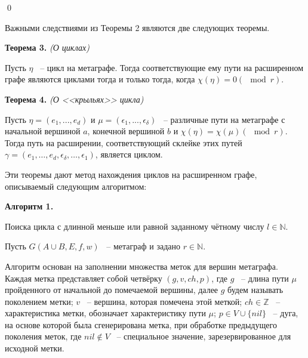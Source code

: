 \documentclass[14pt]{mmcs-article}
\begin{document}
\qed

Важными следствиями из Теоремы 2 являются две следующих теоремы.

\textbf{Теорема 3.} \textsl{(О циклах)}

Пусть $\eta$ ~-- цикл на метаграфе. Тогда соответствующие ему пути на расширенном графе являются циклами тогда и только тогда, когда $\chi(\eta) = 0 (\mod{r})$.

\textbf{Теорема 4.} \textsl{(О <<крыльях>> цикла)}

Пусть $\eta = (e_1, ..., e_d)$ и $\mu = (\epsilon_1, ..., \epsilon_{\delta})$ ~-- различные пути на метаграфе с начальной вершиной $a$, конечной вершиной $b$ и $\chi(\eta) = \chi(\mu) (\mod{r})$. Тогда путь на расширении, соответствующий склейке этих путей \\ $\gamma = (e_1, \dots, e_d, \epsilon_{\delta}, \dots, \epsilon_1)$, является циклом.

Эти теоремы дают метод нахождения циклов на расширенном графе, описываемый следующим алгоритмом:


\textbf{Алгоритм 1.}

Поиска цикла с длинной меньше или равной заданному чётному числу $l \in \mathbb{N}$.

Пусть $G(A \cup B, E, f, w)$ ~-- метаграф и задано $r \in \mathbb{N}$.

Алгоритм основан на заполнении множества меток для вершин метаграфа. Каждая метка представляет собой четвёрку $(g, v, ch, p)$, где $g$ ~-- длина пути $\mu$ пройденного от начальной до помечаемой вершины, далее $g$ будем называть поколением метки; $v$ ~-- вершина, которая помечена этой меткой; $ch \in \mathbb{Z}$ ~-- характеристика метки, обозначает характеристику пути $\mu$; $p \in V \cup \{ nil \}$ ~-- дуга, на основе которой была сгенерирована метка, при обработке предыдущего поколения меток, где $nil \not\in V $ ~-- специальное значение, зарезервированное для исходной метки.
\end{document}
